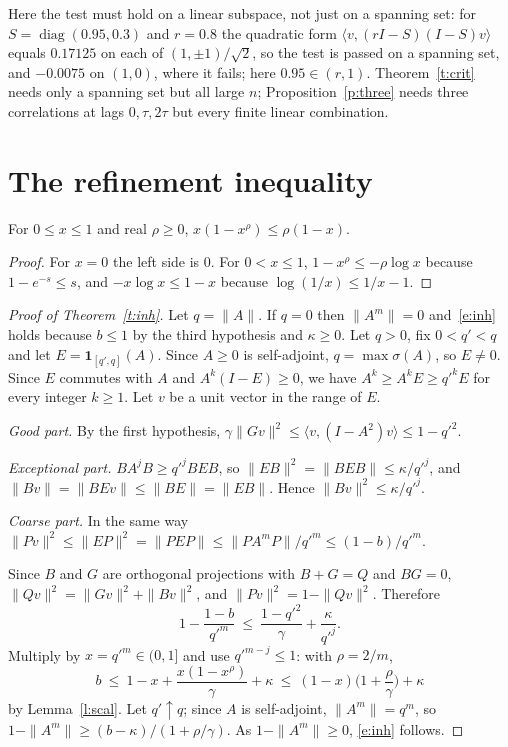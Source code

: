 \begin{remark}\label{r:three}
Here the test must hold on a linear subspace, not just on a spanning set: for $S=\operatorname{diag}(0.95,0.3)$
and $r=0.8$ the quadratic form $\langle v,(rI-S)(I-S)v\rangle$ equals $0.17125$ on each of $(1,\pm1)/\sqrt2$,
so the test is passed on a spanning set, and $-0.0075$ on $(1,0)$, where it fails; here $0.95\in(r,1)$. Theorem~\ref{t:crit} needs only a
spanning set but all large $n$; Proposition~\ref{p:three} needs three correlations at lags $0,\tau,2\tau$ but
every finite linear combination.
\end{remark}

\section{The refinement inequality}\label{s:inh}
\begin{lemma}\label{l:scal}
For $0\le x\le1$ and real $\rho\ge0$, $x(1-x^\rho)\le\rho(1-x)$.
\end{lemma}
\begin{proof}
For $x=0$ the left side is $0$. For $0<x\le1$, $1-x^\rho\le-\rho\log x$ because $1-e^{-s}\le s$, and
$-x\log x\le1-x$ because $\log(1/x)\le1/x-1$.
\end{proof}

\begin{proof}[Proof of Theorem~\ref{t:inh}]
Let $q=\|A\|$. If $q=0$ then $\|A^m\|=0$ and~\eqref{e:inh} holds because $b\le1$ by the third hypothesis and
$\kappa\ge0$. Let $q>0$, fix $0<q'<q$ and let $E=\mathbf 1_{[q',q]}(A)$. Since $A\ge0$ is self-adjoint, $q=\max\sigma(A)$, so $E\ne0$. Since $E$ commutes
with $A$ and $A^k(I-E)\ge0$, we have $A^k\ge A^kE\ge q'^kE$ for every integer $k\ge1$. Let $v$ be a unit
vector in the range of $E$.

\emph{Good part.} By the first hypothesis, $\gamma\|Gv\|^2\le\langle v,(I-A^2)v\rangle\le1-q'^2$.

\emph{Exceptional part.} $BA^jB\ge q'^jBEB$, so $\|EB\|^2=\|BEB\|\le\kappa/q'^j$, and
$\|Bv\|=\|BEv\|\le\|BE\|=\|EB\|$. Hence $\|Bv\|^2\le\kappa/q'^j$.

\emph{Coarse part.} In the same way $\|Pv\|^2\le\|EP\|^2=\|PEP\|\le\|PA^mP\|/q'^m\le(1-b)/q'^m$.

Since $B$ and $G$ are orthogonal projections with $B+G=Q$ and $BG=0$, $\|Qv\|^2=\|Gv\|^2+\|Bv\|^2$, and
$\|Pv\|^2=1-\|Qv\|^2$. Therefore
\[
1-\frac{1-b}{q'^m}\ \le\ \frac{1-q'^2}{\gamma}+\frac{\kappa}{q'^j} .
\]
Multiply by $x=q'^m\in(0,1]$ and use $q'^{m-j}\le1$: with $\rho=2/m$,
\[
b\ \le\ 1-x+\frac{x(1-x^{\rho})}{\gamma}+\kappa\ \le\ (1-x)\Big(1+\frac{\rho}{\gamma}\Big)+\kappa
\]
by Lemma~\ref{l:scal}. Let $q'\uparrow q$; since $A$ is self-adjoint, $\|A^m\|=q^m$, so
$1-\|A^m\|\ge(b-\kappa)/(1+\rho/\gamma)$. As $1-\|A^m\|\ge0$, \eqref{e:inh} follows.
\end{proof}


